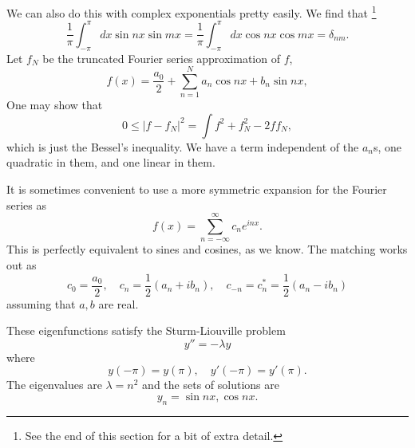 We can also do this with complex exponentials pretty easily. We find that%
    \footnote{See the end of this section for a bit of extra detail.}
\begin{equation}
    \frac{1}{\pi} \int_{-\pi}^\pi dx \sin nx \sin mx = \frac{1}{\pi} \int_{-\pi}^\pi dx \cos nx \cos mx = \delta_{nm}.
\end{equation}
Let $f_N$ be the truncated Fourier series approximation of $f$,
\begin{equation}
    f(x) = \frac{a_0}{2} + \sum_{n=1}^N a_n \cos n x + b_n \sin nx,
\end{equation}
One may show that
\begin{equation}
     0 \leq |f-f_N|^2 = \int f^2 + f_N^2 - 2f f_N,
\end{equation}
which is just the Bessel's inequality.
We have a term independent of the $a_n$s, one quadratic in them, and one linear in them.

It is sometimes convenient to use a more symmetric expansion for the Fourier series as
\begin{equation}
    f(x) = \sum_{n=-\infty}^\infty c_n e^{inx}.
\end{equation}
This is perfectly equivalent to sines and cosines, as we know. The matching works out as
\begin{equation}
    c_0 = \frac{a_0}{2}, \quad c_n = \frac{1}{2}(a_n + i b_n), \quad c_{-n} = c_n^* = \frac{1}{2} (a_n - ib_n)
\end{equation}
assuming that $a,b$ are real.

These eigenfunctions satisfy the Sturm-Liouville problem
\begin{equation}
    y''= -\lambda y
\end{equation}
where
\begin{equation}
    y(-\pi) = y(\pi), \quad y'(-\pi) = y'(\pi).
\end{equation}
The eigenvalues are $\lambda =n^2$ and the sets of solutions are
\begin{equation}
    y_n = \sin nx, \cos nx.
\end{equation}

